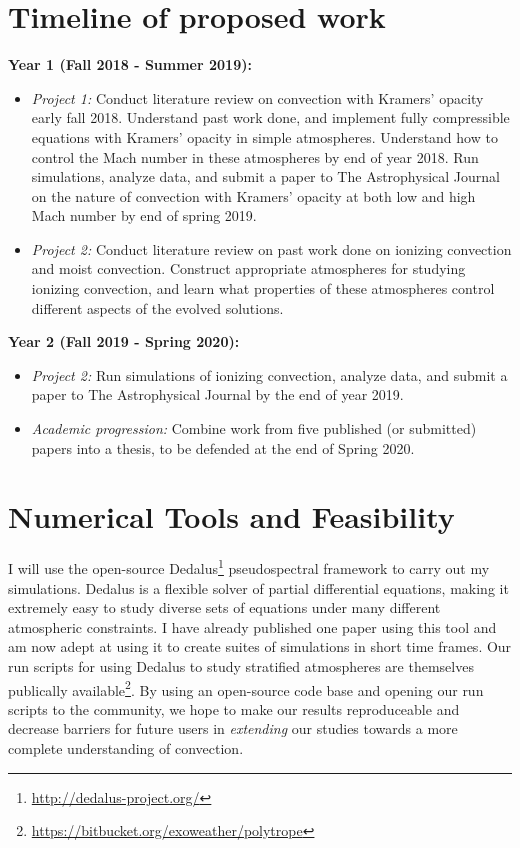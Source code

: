 \documentclass[aasms,12pt]{article}
\begin{document}
\section{Timeline of proposed work}
\textbf{Year 1 (Fall 2018 - Summer 2019):}
\begin{itemize}
\vspace{-0.2cm}
\item \emph{Project 1:} Conduct literature review on convection with Kramers' opacity early fall 2018.  
Understand past work done, and implement fully compressible equations with Kramers'
opacity in simple atmospheres.  Understand how to control the Mach number in these
atmospheres by end of year 2018.  Run simulations, analyze data, and submit a paper to The Astrophysical Journal
on the nature of convection with Kramers' opacity at both low and high Mach number by
end of spring 2019.
\vspace{-0.2cm}
\item \emph{Project 2:} Conduct literature review on past work done on ionizing convection and moist convection.
Construct appropriate atmospheres for studying ionizing convection, and learn what properties of
these atmospheres control different aspects of the evolved solutions.
\end{itemize}

\textbf{Year 2 (Fall 2019 - Spring 2020):}
\begin{itemize}
\vspace{-0.2cm}
\item  \emph{Project 2:} Run simulations of ionizing convection, analyze data, and submit a paper to The
Astrophysical Journal by the end of year 2019.
\vspace{-0.2cm}
\item \emph{Academic progression:} Combine work from five published (or submitted) papers into a thesis, to be defended at the end of 
Spring 2020.
\end{itemize}

\section{Numerical Tools and Feasibility}
I will use the open-source Dedalus\footnote{\url{http://dedalus-project.org/}} pseudospectral framework 
\citep{burns&all2016} to carry out my simulations.  
Dedalus is a flexible solver of partial differential equations,
making it extremely easy to study diverse sets of equations under many different atmospheric
constraints.  I have already published one paper using this tool \citep{anders&brown2017}
and am now adept at using it to create suites of simulations
in short time frames. Our run scripts for using Dedalus to study stratified atmospheres
are themselves publically available\footnote{\url{https://bitbucket.org/exoweather/polytrope}}.
By using an open-source code base and opening our run scripts to the community, we hope to
make our results reproduceable and decrease barriers for future users in 
\emph{extending} our studies towards a more complete understanding of convection.
\end{document}

